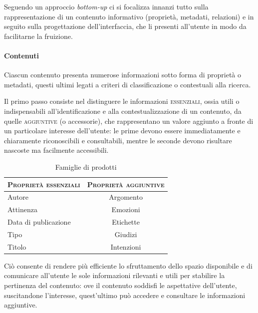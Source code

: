 Seguendo un approccio \textit{bottom-up} ci si focalizza innanzi tutto sulla rappresentazione di un contenuto informativo (proprietà, metadati, relazioni) e in seguito sulla progettazione dell'interfaccia, che li presenti all'utente in modo da facilitarne la fruizione.

\paragraph{Contenuti}
Ciascun contenuto presenta numerose informazioni sotto forma di proprietà o metadati, questi ultimi legati a criteri di classificazione o contestuali alla ricerca.

Il primo passo consiste nel distinguere le informazioni \textsc{essenziali}, ossia utili o indispensabili all'identificazione e alla contestualizzazione di un contenuto, da quelle \textsc{aggiuntive} (o accessorie), che rappresentano un valore aggiunto a fronte di un particolare interesse dell'utente: le prime devono essere immediatamente e chiaramente riconoscibili e consultabili, mentre le seconde devono risultare nascoste ma facilmente accessibili.

\begin{table}
	\centering
	\begin{tabular}{|l|c|}
	\hline
	\textsc{Proprietà essenziali} & \textsc{Proprietà aggiuntive} \\ \hline
	Autore  & Argomento \\
	Attinenza & Emozioni\\
	Data di publicazione & Etichette \\
	Tipo & Giudizi \\
	Titolo & Intenzioni \\ \hline
	\end{tabular}
	\caption{Famiglie di prodotti}
	\label{tab:tesi:stage:design:tipi-proprietà}
\end{table}

Ciò consente di rendere più efficiente lo sfruttamento dello spazio disponibile e di comunicare all'utente le sole informazioni rilevanti e utili per stabilire la pertinenza del contenuto: ove il contenuto soddisfi le aspettative dell'utente, suscitandone l'interesse, quest'ultimo può accedere e consultare le informazioni aggiuntive.

